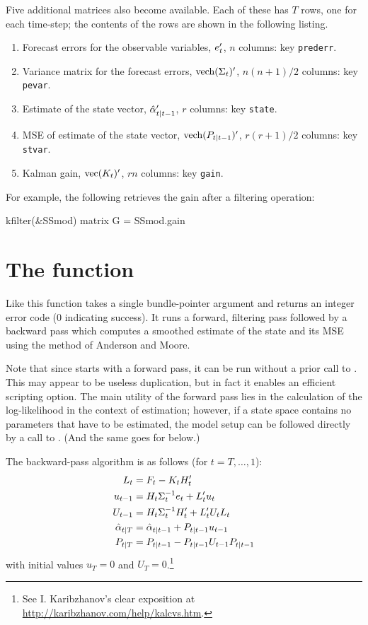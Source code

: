 \documentclass[a4paper]{article}
\begin{document}
Five additional matrices also become available.  Each of these has $T$
rows, one for each time-step; the contents of the rows are shown in
the following listing.
%
\begin{enumerate}
\item Forecast errors for the observable variables, $e_t'$, $n$
  columns: key \texttt{prederr}.
\item Variance matrix for the forecast errors, $\mbox{vech}(\Sigma_t)'$,
  $n(n+1)/2$ columns: key \texttt{pevar}.
\item Estimate of the state vector, $\hat{\alpha}_{t|t-1}'$, $r$
  columns: key \texttt{state}.
\item MSE of estimate of the state vector,
  $\mbox{vech}(P_{t|t-1})'$, $r(r+1)/2$ columns: key \texttt{stvar}.
\item Kalman gain, $\mbox{vec}(K_t)'$, $rn$ columns: key
  \texttt{gain}.
\end{enumerate}

For example, the following retrieves the gain after a filtering
operation:
%
\begin{code}
kfilter(&SSmod)
matrix G = SSmod.gain
\end{code}

\section{The  function}
\label{sec:ksmooth}

Like  this function takes a single bundle-pointer
argument and returns an integer error code (0 indicating success).  It
runs a forward, filtering pass followed by a backward pass which
computes a smoothed estimate of the state and its MSE using the method
of Anderson and Moore.

Note that since  starts with a forward pass, it can be
run without a prior call to . This may appear to be
useless duplication, but in fact it enables an efficient scripting
option.  The main utility of the forward pass lies in the calculation
of the log-likelihood in the context of estimation; however, if a
state space contains no parameters that have to be estimated, the
model setup can be followed directly by a call to . (And
the same goes for  below.)

The backward-pass algorithm is as follows (for $t=T,\dots,1$):
%
\begin{align*}
L_t &= F_t - K_t H_t' \\
u_{t-1} &= H_t \Sigma_t^{-1} e_t 
 + L_t' u_t \\
U_{t-1} &= H_t \Sigma_t^{-1} H_t' + 
  L_t' U_t L_t \\
\hat{\alpha}_{t|T} &= \hat{\alpha}_{t|t-1} + 
  P_{t|t-1} u_{t-1} \\
P_{t|T} &= P_{t|t-1} - 
  P_{t|t-1} U_{t-1} P_{t|t-1}
\end{align*}
%
with initial values $u_T = 0$ and $U_T =
0$.\footnote{See I. Karibzhanov's clear exposition at
\url{http://karibzhanov.com/help/kalcvs.htm}.}
\end{document}
